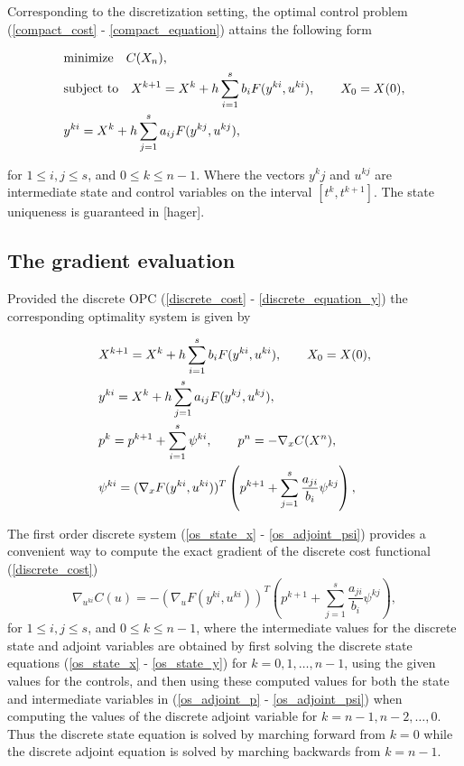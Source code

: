 \documentclass[a4paper,10pt, english]{article}
\newcommand{\D}{\displaystyle}
\begin{document}
 Corresponding to the discretization setting, the optimal control problem (\ref{compact_cost} -  \ref{compact_equation})  attains the following form
 
 \begin{align}
  \D
  & \mbox{minimize}\quad C(X_n), \label{discrete_cost}\\
  & \mbox{subject to} \quad X^{k+1}  = X^k + h\sum_{i=1}^{s}b_iF(y^{ki}, u^{ki}), \qquad X_0 = X(0), \label{discrete_equation_x}\\
  & y^{ki} = X^k + h\sum_{j=1}^{s}a_{ij}F(y^{kj}, u^{kj}),\label{discrete_equation_y}
  \end{align}
 
 for $1\leq i, j\leq s$, and $0\leq k\leq n-1$.
 Where the vectors $y^kj$ and $u^{kj}$ are intermediate state and control variables on the interval $[t^k, t^{k+1}]$. The state uniqueness is guaranteed in [hager]. 
 
 
 

\newpage
\subsection{The gradient evaluation}
Provided the discrete OPC (\ref{discrete_cost} - \ref{discrete_equation_y}) the corresponding  optimality system  is given by

  \begin{align}
   \D
    & X^{k+1}  = X^k + h\sum_{i=1}^{s}b_iF(y^{ki}, u^{ki}), \qquad X_0 = X(0),   \label{os_state_x}\\
 	& y^{ki} = X^k + h\sum_{j=1}^{s}a_{ij}F(y^{kj}, u^{kj}),   \label{os_state_y}\\
 	& p^k = p^{k+1} + \sum_{i=1}^{s}\psi^{ki}, \qquad p^n = - \nabla_xC(X^n),  \label{os_adjoint_p}\\
 	& \psi^{ki} = (\nabla_x F(y^{ki}, u^{ki}))^{T} \left( p^{k+1} + \sum_{j=1}^{s} \frac{a_{ji}}{b_i}\psi^{kj}\right), \label{os_adjoint_psi} 
   \end{align}

The first order discrete system (\ref{os_state_x} - \ref{os_adjoint_psi}) provides a convenient way to compute the exact gradient of the discrete cost functional (\ref{discrete_cost})
\begin{equation}
\nabla_{u^{ki}} C(u) = - (\nabla_u F(y^{ki}, u^{ki}))^{T} \left( p^{k+1} + \sum_{j=1}^{s}\frac{a_{ji}}{b_i}\psi^{kj}\right), 
\label{discretegradient}
 \end{equation}  
 for $1\leq i, j\leq s$, and $0\leq k\leq n-1$, where the intermediate values for the discrete state and adjoint variables are obtained by first
 solving the discrete state equations (\ref{os_state_x} - \ref{os_state_y}) for $k=0, 1, \dots, n-1$, using the given values for the controls, and then using these computed values for both the state and intermediate variables in (\ref{os_adjoint_p} - \ref{os_adjoint_psi}) when computing the values of the discrete adjoint variable for $k=n-1, n-2, \dots, 0$. Thus the discrete state equation is solved by marching forward from 
 $ k = 0$ while the discrete adjoint equation is solved by marching backwards from $k = n-1$.
 
\end{document}
